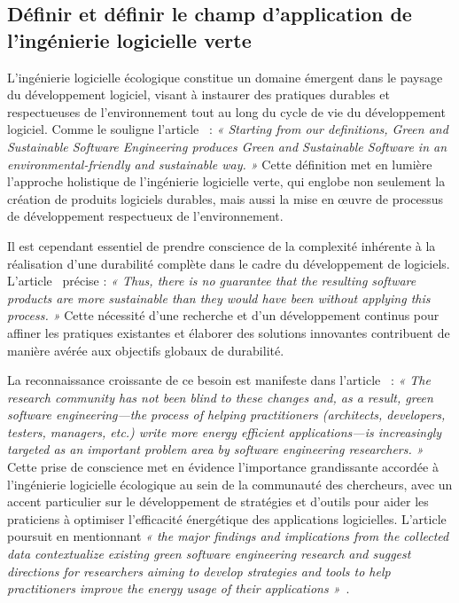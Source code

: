 \subsection{Définir et définir le champ d'application de l'ingénierie logicielle verte}
L'ingénierie logicielle écologique constitue un domaine émergent dans le paysage du développement logiciel, visant à instaurer des pratiques durables et respectueuses de l'environnement tout au long du cycle de vie du développement logiciel. Comme le souligne l'article~\cite{GreenSoftModel} : \emph{« Starting from our definitions, Green and Sustainable Software Engineering produces Green and Sustainable Software in an environmental-friendly and sustainable way. »} Cette définition met en lumière l'approche holistique de l'ingénierie logicielle verte, qui englobe non seulement la création de produits logiciels durables, mais aussi la mise en œuvre de processus de développement respectueux de l'environnement.


Il est cependant essentiel de prendre conscience de la complexité inhérente à la réalisation d'une durabilité complète dans le cadre du développement de logiciels. L'article~\cite{GreenSoftModel} précise : \emph{« Thus, there is no guarantee that the resulting software products are more sustainable than they would have been without applying this process. »} Cette nécessité d'une recherche et d'un développement continus pour affiner les pratiques existantes et élaborer des solutions innovantes contribuent de manière avérée aux objectifs globaux de durabilité.


La reconnaissance croissante de ce besoin est manifeste dans l'article~\cite{EmpiricalStudy} : \emph{« The research community has not been blind to these changes and, as a result, green software engineering—the process of helping practitioners (architects, developers, testers, managers, etc.) write more energy efficient applications—is increasingly targeted as an important problem area by software engineering researchers. »} Cette prise de conscience met en évidence l'importance grandissante accordée à l'ingénierie logicielle écologique au sein de la communauté des chercheurs, avec un accent particulier sur le développement de stratégies et d'outils pour aider les praticiens à optimiser l'efficacité énergétique des applications logicielles. L'article poursuit en mentionnant \emph{« the major findings and implications from the collected data contextualize existing green software engineering research and suggest directions for researchers aiming to develop strategies and tools to help practitioners improve the energy usage of their applications »}~\cite{EmpiricalStudy}.


